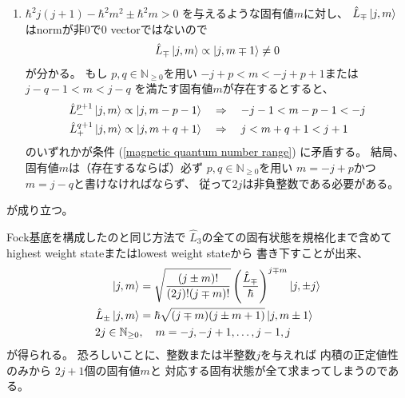 \begin{enumerate}
{    }
    \item{
        $\hbar^2 j (j+1) - \hbar^2 m^2 \pm \hbar^2 m > 0$
        を与えるような固有値$m$に対し、
        $ \hat{L}_\mp \ket{ j, m } $
        はnormが非0で$0$ vectorではないので
        \begin{align}
            \hat{L}_\mp \ket{ j, m } \propto \ket{ j, m \mp 1 } \neq 0
        \end{align}
        が分かる。
        もし
        $p, q \in \mathbb{N}_{\ge0}$を用い
        $- j + p < m < - j + p + 1$または
        $j - q - 1 < m < j - q$
        を満たす固有値$m$が存在するとすると、
        \begin{subequations}
        \begin{align}
            \hat{L}_-^{p+1} \ket{ j, m }
            \propto \ket{ j, m - p - 1}
        \quad&\Rightarrow\quad
            - j - 1 < m - p - 1 < -j
        \\
            \hat{L}_+^{q+1} \ket{ j, m }
            \propto \ket{ j, m + q + 1}
        \quad&\Rightarrow\quad
            j < m + q + 1 < j + 1
        \end{align}
        \end{subequations}
        のいずれかが条件
        (\ref{magnetic quantum number range})
        に矛盾する。
        結局、固有値$m$は（存在するならば）必ず
        $p, q \in \mathbb{N}_{\ge0}$を用い
        $m = - j + p$かつ$ m = j - q$と書けなければならず、
        従って$ 2j $は非負整数である必要がある。
    }
\end{enumerate}
が成り立つ。

Fock基底を構成したのと同じ方法で
$\hat{L}_3$の全ての固有状態を規格化まで含めて
highest weight stateまたはlowest weight stateから
書き下すことが出来、
\begin{subequations}
\begin{align}
    \ket{ j, m }
    &=
    \sqrt{\dfrac{
        (j \pm m)!
    }{
        (2j)! (j \mp m)!
    }}
    \left(
        \dfrac{\hat{L}_\mp}{\hbar}
    \right)^{j \mp m}
    \ket{ j, \pm j }
\\
    \hat{L}_\pm \ket{ j, m }
    &= \hbar
    \sqrt{(j \mp m)(j \pm m + 1)}
    \ket{ j, m \pm 1 }
\\
    2j \in \mathbb{N}_{\ge0}
    &,\quad
    m = - j, - j + 1, \dots, j - 1, j
\end{align}
\end{subequations}
が得られる。
恐ろしいことに、整数または半整数$j$を与えれば
内積の正定値性のみから
$2j +1$個の固有値$m$と
対応する固有状態が全て求まってしまうのである。
